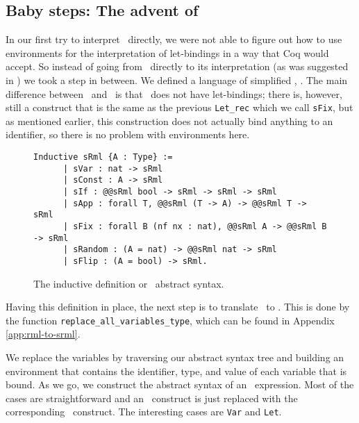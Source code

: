\documentclass[11pt, leqno, titlepage]{article}
\def\coqe{\lstinline[language=Coq, basicstyle=\small]}
\theoremstyle{definition}
\begin{document}
\subsection{Baby steps: The advent of \srml}
\label{sec:srml}
In our first try to interpret \rmlx\ directly, we were not able to figure out how to
use environments for the interpretation of let-bindings in a way that Coq would
accept. So instead of going from \rmlx\ directly to its interpretation (as was
suggested in \cite{rml-paper})
we took a step in between. We defined a language of simplified \rmlx, \srml. The main
difference between \rmlx\ and \srml\ is that \srml\ does not have let-bindings; there is,
however, still a construct that is the same as the previous \coqe{Let_rec} which we
call \coqe{sFix}, but as mentioned earlier, this construction does not actually bind
anything to an identifier, so there is no problem with environments here.

\begin{figure}[h]
  \centering
  \begin{minipage}{0.8\linewidth}
    \begin{lstlisting}[language=coq]
      Inductive sRml {A : Type} :=
      | sVar : nat -> sRml
      | sConst : A -> sRml
      | sIf : @@sRml bool -> sRml -> sRml -> sRml
      | sApp : forall T, @@sRml (T -> A) -> @@sRml T -> sRml
      | sFix : forall B (nf nx : nat), @@sRml A -> @@sRml B -> sRml
      | sRandom : (A = nat) -> @@sRml nat -> sRml
      | sFlip : (A = bool) -> sRml.
    \end{lstlisting}
  \caption{The inductive definition or \srml\ abstract syntax.}
  \end{minipage}
\end{figure}

Having this definition in place, the next step is to translate \rmlx\ to \srml. This
is done by the function \coqe{replace_all_variables_type}, which can be found in
Appendix \ref{app:rml-to-srml}. 

We replace the variables by traversing our abstract syntax tree and building an
environment that contains the identifier, type, and value of each variable that is
bound. As we go, we construct the abstract syntax of an \srml\ expression. Most of
the cases are straightforward and an \rmlx\ construct is just replaced with the
corresponding \srml\ construct. The interesting cases are \coqe{Var} and
\coqe{Let}.
\end{document}
